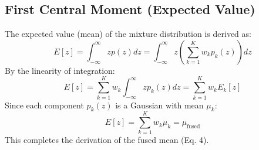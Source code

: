 \documentclass{article}
\theoremstyle{plain}
\theoremstyle{definition}
\theoremstyle{remark}
\begin{document}
\subsection{First Central Moment (Expected Value)}
The expected value (mean) of the mixture distribution is derived as:
\begin{equation}
    E[z] = \int_{-\infty}^{\infty} z p(z) dz = \int_{-\infty}^{\infty} z \left( \sum_{k=1}^K w_k p_k(z) \right) dz
\end{equation}
By the linearity of integration:
\begin{equation}
    E[z] = \sum_{k=1}^K w_k \int_{-\infty}^{\infty} z p_k(z) dz = \sum_{k=1}^K w_k E_k[z]
\end{equation}
Since each component $p_k(z)$ is a Gaussian with mean $\mu_k$:
\begin{equation}
    E[z] = \sum_{k=1}^K w_k \mu_k = \mu_{\text{fused}}
\end{equation}
This completes the derivation of the fused mean (Eq. 4).
\end{document}

